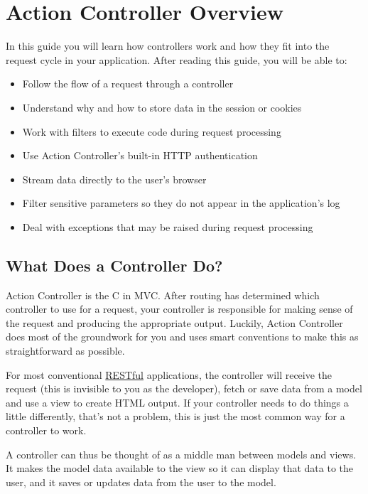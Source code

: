 \documentclass[10pt]{book}
\begin{document}
\chapter{Action Controller Overview}

In this guide you will learn how controllers work and how they fit  into the request cycle in your application. After reading this guide,  you will be able to:
\begin{itemize}
	\item Follow the flow of a request through a controller
	\item Understand why and how to store data in the session or cookies
	\item Work with filters to execute code during request processing
	\item Use Action Controller’s built-in HTTP authentication
	\item Stream data directly to the user’s browser
	\item Filter sensitive parameters so they do not appear in the application’s log
	\item Deal with exceptions that may be raised during request processing
\end{itemize}

\section{ What Does a Controller Do?}

Action Controller is the C in MVC. After  routing has determined which controller to use for a request, your  controller is responsible for making sense of the request and producing  the appropriate output. Luckily, Action Controller does most of the  groundwork for you and uses smart conventions to make this as  straightforward as possible.

For most conventional \href{http://en.wikipedia.org/wiki/Representational_state_transfer}{RESTful}  applications, the controller will receive the request (this is  invisible to you as the developer), fetch or save data from a model and  use a view to create HTML output. If your  controller needs to do things a little differently, that’s not a  problem, this is just the most common way for a controller to work.

A controller can thus be thought of as a middle man between models  and views. It makes the model data available to the view so it can  display that data to the user, and it saves or updates data from the  user to the model.
\end{document}
